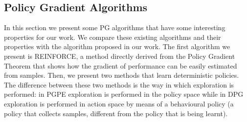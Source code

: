 \subsection{Policy Gradient Algorithms} \label{subsec:alg}
In this section we present some \ac{PG} algorithms that have some interesting properties for our work. We compare these existing algorithms and their properties with the algorithm proposed in our work. The first algorithm we present is REINFORCE, a method directly derived from the Policy Gradient Theorem that shows how the gradient of performance can be easily estimated from samples. Then, we present two methods that learn deterministic policies. The difference between these two methods is the way in which exploration is performed: in \acf{PGPE} exploration is performed in the policy space while in \acf{DPG} exploration is performed in action space by means of a behavioural policy (\ie a policy that collects samples, different from the policy that is being learnt).

